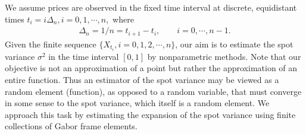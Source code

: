 We assume prices are observed in the fixed time interval \domain at discrete, equidistant times $t_i = i \Delta_n, i= 0,1,\cdots,n, $ where 
 \begin{align}
   \Delta_n = 1/n = t_{i + 1} - t_i, \qquad i = 0, \cdots, n-1.
   \label{}
 \end{align}
 Given the finite sequence  $\{X_{t_i}, i=0,1,2,\cdots,n\}$, our aim is to estimate the spot variance $\sigma^2$ in the time interval $[0,1]$ by nonparametric methods. Note that our objective is not an approximation of a point but rather the approximation of an entire function. Thus an estimator of the spot variance may be viewed as a  random element (function), as opposed to a random variable, that must converge in some sense to the spot variance, which itself is a random element. We approach this task  by estimating the expansion of the spot variance using  finite collections of  Gabor frame elements.
